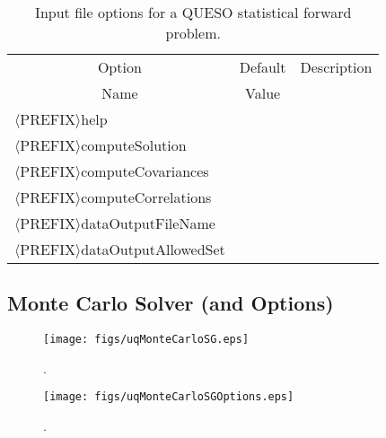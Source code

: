 \begin{table}[!h]
\begin{center}
\begin{tabular}{|l|c|c|}
\hline
\multicolumn{1}{|c|}{Option}                 & Default & Description \\
\multicolumn{1}{|c|}{Name}                   & Value   &             \\
\hline
\hline
$\langle$PREFIX$\rangle$help                 &         &             \\
\hline
$\langle$PREFIX$\rangle$computeSolution      &         &             \\
\hline
$\langle$PREFIX$\rangle$computeCovariances   &         &             \\
\hline
$\langle$PREFIX$\rangle$computeCorrelations  &         &             \\
\hline
$\langle$PREFIX$\rangle$dataOutputFileName   &         &             \\
\hline
$\langle$PREFIX$\rangle$dataOutputAllowedSet &         &             \\
\hline
\end{tabular}
\end{center}
\caption{
Input file options for a QUESO statistical forward problem.
}
\label{tab-sfp-options}
\end{table}

\clearpage
\subsection{Monte Carlo Solver (and Options)}

\begin{figure}[h!]
\centerline{
\texttt{[image: figs/uqMonteCarloSG.eps]}
}
\caption{
{\color{red}{The Monte Carlo sequence generator class}}.
}
\label{fig-monte-carlo-solver-class}
\end{figure}

\begin{figure}[h!]
\begin{center}
\texttt{[image: figs/uqMonteCarloSGOptions.eps]}
\end{center}
\caption{
{\color{red}{The Monte Carlo sequence generator options class}}.
}
\label{fig-monte-carlo-options-class}
\end{figure}

